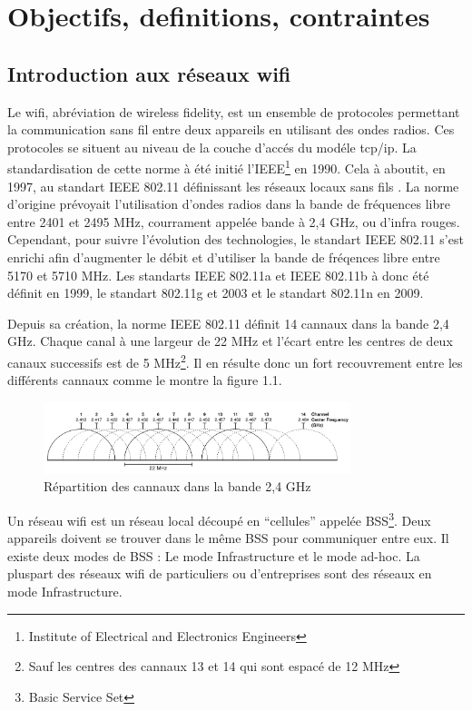 \chapter{Objectifs, definitions, contraintes}
\section{Introduction aux réseaux wifi}

Le wifi, abréviation de wireless fidelity, est un ensemble de protocoles permettant la communication sans fil entre deux
appareils en utilisant des ondes radios. Ces protocoles se situent au niveau de la couche d'accés du modéle tcp/ip.
La standardisation de cette norme à été initié l'IEEE\footnote{Institute of Electrical and Electronics Engineers} en 1990.
Cela à aboutit, en 1997, au standart IEEE 802.11 définissant les réseaux locaux sans fils \cite{WFintro}.
La norme d'origine prévoyait l'utilisation d'ondes radios dans la bande de fréquences libre entre 2401 et 2495 MHz\cite{WFband},
courrament appelée bande à 2,4 GHz, ou d'infra rouges. Cependant, pour suivre l'évolution des technologies, le standart IEEE 
802.11 s'est enrichi afin d'augmenter le débit et d'utiliser la bande de fréqences libre entre 5170 et 5710 MHz.
Les standarts IEEE 802.11a et IEEE 802.11b à donc été définit en 1999, le standart 802.11g et 2003 et le standart 802.11n
en 2009.

Depuis sa création, la norme IEEE 802.11 définit 14 cannaux dans la bande 2,4 GHz. Chaque canal à une largeur de 22 MHz et 
l'écart entre les centres de deux canaux successifs est de 5 MHz\footnote{Sauf les centres des cannaux 13 et 14 qui sont espacé
de 12 MHz}. Il en résulte donc un fort recouvrement entre les différents cannaux comme le montre la figure 1.1.

\begin{figure}
   \centering
   \includegraphics[width=0.8\textwidth,natwidth=610,natheight=642]{images/cannaux.png}
   \caption{Répartition des cannaux dans la bande 2,4 GHz}
\end{figure}

Un réseau wifi est un réseau local découpé en ``cellules'' appelée BSS\footnote{Basic Service Set}. Deux appareils
doivent se trouver dans le même BSS pour communiquer entre eux. Il existe deux modes de BSS : Le mode Infrastructure et le
mode ad-hoc\cite{WFfunc2}. La pluspart des réseaux wifi de particuliers ou d'entreprises sont des réseaux en mode Infrastructure.

